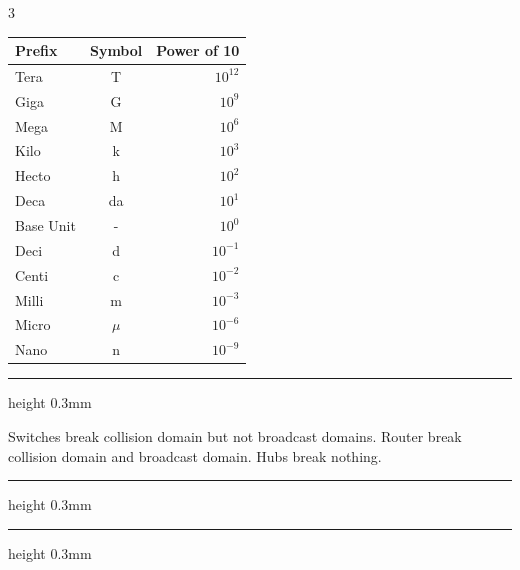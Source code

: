 \documentclass[10pt,landscape]{article}
\begin{document}
\begin{multicols}{3}
    \begin{tabular}{|l|c|r|}
        \hline
        \textbf{Prefix} & \textbf{Symbol} & \textbf{Power of 10} \\
        \hline
        Tera  & T  & $10^{12}$ \\
        Giga  & G  & $10^{9}$  \\
        Mega  & M  & $10^{6}$  \\
        Kilo  & k  & $10^{3}$  \\
        Hecto & h  & $10^{2}$  \\
        Deca  & da & $10^{1}$  \\
        Base Unit & - & $10^{0}$  \\
        Deci  & d  & $10^{-1}$  \\
        Centi & c  & $10^{-2}$  \\
        Milli & m  & $10^{-3}$  \\
        Micro & $\mu$  & $10^{-6}$  \\
        Nano  & n  & $10^{-9}$  \\
        \hline
    \end{tabular}
\hrule height 0.3mm

Switches break collision domain but not broadcast domains. Router break collision domain and broadcast domain.
Hubs break nothing.

\hrule height 0.3mm
\hrule height 0.3mm


\end{multicols}
\end{document}
